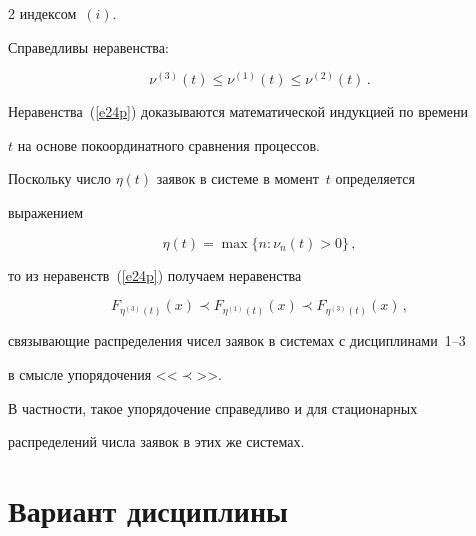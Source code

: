 \begin{multicols}{2}
индексом~$(i)$.





Справедливы неравенства:


\begin{equation}


\nu^{(3)}(t)    \le \nu^{(1)}(t) \le \nu^{(2)}(t)\,.


\label{e24p}


\end{equation}


Неравенства~(\ref{e24p}) доказываются математической индукцией по времени


$t$ на основе покоординатного сравнения процессов.





Поскольку число $\eta(t)$ заявок в системе в момент~$t$ определяется


выражением


$$


\eta(t) = \max\{n: \nu_n(t)>0\}\,,


$$


то из неравенств~(\ref{e24p}) получаем неравенства


$$


F_{\eta^{(3)}(t)}(x) \prec F_{\eta^{(1)}(t)}(x) \prec F_{\eta^{(3)}(t)}(x)\,,


$$


связывающие распределения чисел заявок в системах с дисциплинами~1--3


в смысле упорядочения <<$\prec$>>.


В частности, такое упорядочение справедливо и для стационарных


распределений числа заявок в этих же системах.










\section{Вариант дисциплины}











\end{multicols}
